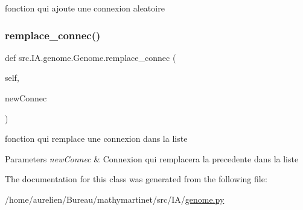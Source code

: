 fonction qui ajoute une connexion aleatoire 

\mbox{\label{classsrc_1_1_i_a_1_1genome_1_1_genome_aed3a26c1418ec0b34d654c6f9464b709}} 
\subsubsection{\texorpdfstring{remplace\+\_\+connec()}{remplace\_connec()}}
{\footnotesize\ttfamily def src.\+I\+A.\+genome.\+Genome.\+remplace\+\_\+connec (\begin{DoxyParamCaption}\item[{}]{self,  }\item[{}]{new\+Connec }\end{DoxyParamCaption})}



fonction qui remplace une connexion dans la liste 


\begin{DoxyParams}{Parameters}
{\em new\+Connec} & Connexion qui remplacera la precedente dans la liste \\
\hline
\end{DoxyParams}


The documentation for this class was generated from the following file\+:\begin{DoxyCompactItemize}
\item 
/home/aurelien/\+Bureau/mathymartinet/src/\+I\+A/\hyperlink{genome_8py}{genome.\+py}\end{DoxyCompactItemize}
